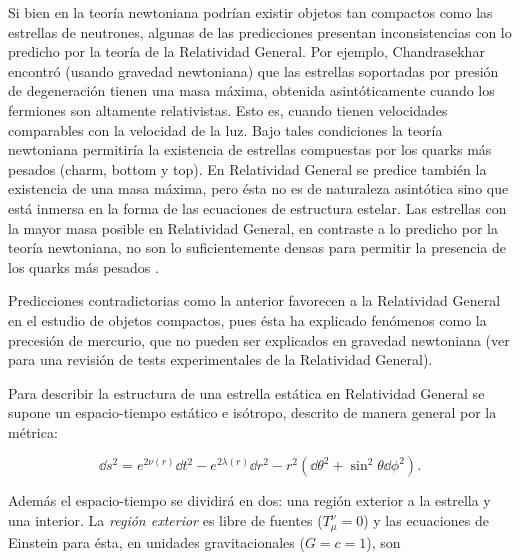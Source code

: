 Si bien en la teoría newtoniana podrían existir objetos tan compactos como las estrellas de neutrones, algunas de las predicciones presentan inconsistencias con lo predicho por la teoría de la Relatividad General. Por ejemplo, Chandrasekhar encontró (usando gravedad newtoniana) que las estrellas soportadas por presión de degeneración tienen una masa máxima, obtenida asintóticamente cuando los fermiones son altamente relativistas. Esto es, cuando tienen velocidades comparables con la velocidad de la luz. Bajo tales condiciones la teoría newtoniana permitiría la existencia de estrellas compuestas por los quarks más pesados (charm, bottom y top). En Relatividad General se predice también la existencia de una masa máxima, pero ésta no es de naturaleza asintótica sino que está inmersa en la forma de las ecuaciones de estructura estelar. Las estrellas con la mayor masa posible en Relatividad General, en contraste a lo predicho por la teoría newtoniana, no son lo suficientemente densas para permitir la presencia de los quarks más pesados \cite{Glendenning2000}.

Predicciones contradictorias como la anterior favorecen a la Relatividad General en el estudio de objetos compactos, pues ésta ha explicado fenómenos como la precesión de mercurio, que no pueden ser explicados en gravedad newtoniana (ver  \cite{Turyshev2008ExperimentalRelativity} para una revisión de tests experimentales de la Relatividad General).

Para describir la estructura de una estrella estática en Relatividad General se supone un espacio-tiempo estático e isótropo, descrito de manera general por la métrica:

\begin{equation}
\dd{s}^ { 2 } = e ^ { 2 \nu ( r ) } \dd{ t} ^ { 2 } - e ^ { 2 \lambda ( r ) } \dd{ r} ^ { 2 } - r ^ { 2 } \left( \dd{ \theta} ^ { 2 } + \sin ^ { 2 }  \theta  \dd{ \phi} ^ { 2 } \right) .   
\end{equation}

Además el espacio-tiempo se dividirá en dos: una región exterior a la estrella y una interior. 
La \textit{región exterior} es libre de fuentes ($T _ { \mu } ^ { \nu }=0$) y las ecuaciones de Einstein para ésta, en unidades gravitacionales ($G=c=1$), son 

